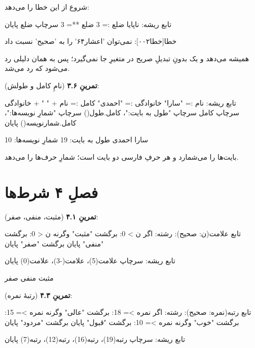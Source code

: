 شروع از  این خطا را می‌دهد:

\begin{salamfa}
تابع ریشه:
    ناپایا ضلع := 3
    ضلع **= 3
    سرچاپ ضلع
پایان
\end{salamfa}

\begin{progoutfa}
خطا[خطا۰۰۲]: نمی‌توان 'اعشار۶۴' را به 'صحیح' نسبت داد
\end{progoutfa}

\code{**} همیشه  می‌دهد و یک  بدونِ تبدیلِ صریح در متغیرِ  جا نمی‌گیرد؛ پس  به همان دلیلی رد می‌شود که  رد می‌شد.

\textbf{تمرینِ ۳.۶} (نامِ کامل و طولش):
\begin{salamfa}
تابع ریشه:
    نام := "سارا"
    خانوادگی := "احمدی"
    کامل := نام + " " + خانوادگی
    سرچاپ کامل
    سرچاپ "طول به بایت:"، کامل.طول()
    سرچاپ "شمارِ نویسه‌ها:"، کامل.شمارنویسه()
پایان
\end{salamfa}

\begin{progoutfa}
سارا احمدی
طول به بایت: 19
شمارِ نویسه‌ها: 10
\end{progoutfa}

 بایت‌ها را می‌شمارد و هر حرفِ فارسی دو بایت است؛ شمارِ حرف‌ها را  می‌دهد.

\section*{فصلِ ۴ شرط‌ها}
{}

\textbf{تمرینِ ۴.۱} (مثبت، منفی، صفر):
\begin{salamfa}
تابع علامت(ن: صحیح): رشته:
    اگر ن > 0:
        برگشت "مثبت"
    وگرنه ن < 0:
        برگشت "منفی"
    پایان
    برگشت "صفر"
پایان

تابع ریشه:
    سرچاپ علامت(5)، علامت(-3)، علامت(0)
پایان
\end{salamfa}

\begin{progoutfa}
مثبت منفی صفر
\end{progoutfa}

\textbf{تمرینِ ۴.۳} (رتبهٔ نمره):
\begin{salamfa}
تابع رتبه(نمره: صحیح): رشته:
    اگر نمره >= 18:
        برگشت "عالی"
    وگرنه نمره >= 15:
        برگشت "خوب"
    وگرنه نمره >= 10:
        برگشت "قبول"
    پایان
    برگشت "مردود"
پایان

تابع ریشه:
    سرچاپ رتبه(19)، رتبه(16)، رتبه(12)، رتبه(7)
پایان
\end{salamfa}

